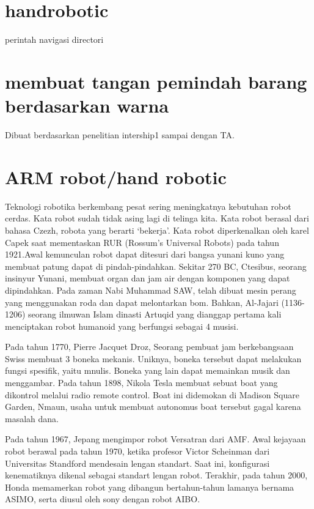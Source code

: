\section{handrobotic}
perintah navigasi directori

\section{membuat tangan pemindah barang berdasarkan warna}
Dibuat berdasarkan penelitian intership1 sampai dengan TA.

\section {ARM robot/hand robotic}
Teknologi robotika berkembang pesat sering meningkatnya kebutuhan robot cerdas. Kata robot sudah tidak asing lagi di telinga kita. Kata robot berasal dari bahasa Czezh, robota yang berarti ‘bekerja’. Kata robot diperkenalkan oleh karel Capek saat mementaskan RUR (Rossum’s Universal Robots) pada tahun 1921.Awal kemunculan robot dapat ditesuri dari bangsa yunani kuno yang membuat patung dapat di pindah-pindahkan. Sekitar 270 BC, Ctesibus, seorang insinyur Yunani, membuat organ dan jam air dengan komponen yang dapat dipindahkan. Pada zaman Nabi Muhammad SAW, telah dibuat mesin perang yang menggunakan roda dan dapat melontarkan bom. Bahkan, Al-Jajari (1136-1206) seorang ilmuwan Islam dinasti Artuqid yang dianggap pertama kali menciptakan robot humanoid yang berfungsi sebagai 4 musisi.

Pada tahun 1770, Pierre Jacquet Droz, Seorang pembuat jam berkebangsaan Swiss membuat 3 boneka mekanis. Uniknya, boneka tersebut dapat melakukan fungsi spesifik, yaitu mnulis. Boneka yang lain dapat memainkan musik dan menggambar. Pada tahun 1898, Nikola Tesla membuat sebuat boat yang dikontrol melalui radio remote control. Boat ini didemokan di Madison Square Garden, Nmaun, usaha untuk membuat autonomus boat tersebut gagal karena masalah dana.

	Pada tahun 1967, Jepang mengimpor robot Versatran dari AMF. Awal kejayaan robot berawal pada tahun 1970, ketika profesor Victor Scheinman dari Universitas Standford mendesain lengan standart. Saat ini, konfigurasi kenematiknya dikenal sebagai standart lengan robot. Terakhir, pada tahun 2000, Honda memamerkan robot yang dibangun bertahun-tahun lamanya bernama ASIMO, serta diusul oleh sony dengan robot AIBO. 

